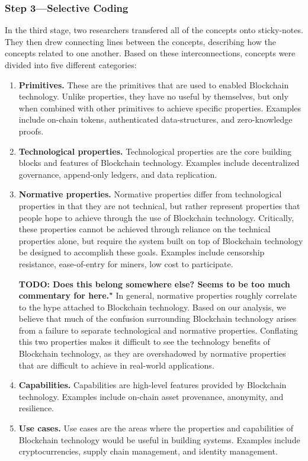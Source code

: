 \subsubsection{Step 3---Selective Coding}
In the third stage, two researchers transfered all of the concepts onto sticky-notes.
They then drew connecting lines between the concepts, describing how the concepts related to one another.
Based on these interconnections, concepts were divided into five different categories:

\begin{enumerate}
	\item \textbf{Primitives.} These are the primitives that are used to enabled Blockchain technology. Unlike properties, they have no useful by themselves, but only when combined with other primitives to achieve specific properties. Examples include on-chain tokens, authenticated data-structures, and zero-knowledge proofs.
	
	\item \textbf{Technological properties.} Technological properties are the core building blocks and features of Blockchain technology. Examples include decentralized governance, append-only ledgers, and data replication.
	
	\item \textbf{Normative properties.} Normative properties differ from technological properties in that they are not technical, but rather represent properties that people hope to achieve through the use of Blockchain technology. Critically, these properties cannot be achieved through reliance on the technical properties alone, but require the system built on top of Blockchain technology be designed to accomplish these goals. Examples include censorship resistance, ease-of-entry for miners, low cost to participate.
	
	\hspace{1em}\textbf{TODO: Does this belong somewhere else? Seems to be too much commentary for here."}
	In general, normative properties roughly correlate to the hype attached to Blockchain technology.
	Based on our analysis, we believe that much of the confusion surrounding Blockchain technology arises from a failure to separate technological and normative properties. Conflating this two properties makes it difficult to see the technology benefits of Blockchain technology, as they are overshadowed by normative properties that are difficult to achieve in real-world applications.
	
	\item \textbf{Capabilities.} Capabilities are high-level features provided by Blockchain technology. Examples include on-chain asset provenance, anonymity, and resilience.
	
	\item \textbf{Use cases.} Use cases are the areas where the properties and capabilities of Blockchain technology would be useful in building systems. Examples include cryptocurrencies, supply chain management, and identity management.
\end{enumerate}

